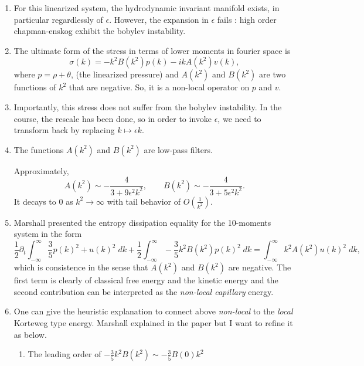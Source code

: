 \documentclass[a4paper,12pt]{article}
\begin{document}
\begin{enumerate}
 \item For this linearized system, the hydrodynamic invariant manifold exists, in particular regardlessly of $\epsilon$. However, the expansion in $\epsilon$ fails : high order chapman-enskog exhibit the bobylev instability.
 
 \item The ultimate form of the stress in terms of lower moments in fourier space is
 $$\sigma(k) = - k^2 B(k^2) p(k) - i k A(k^2)v(k),$$
 where $p = \rho + \theta$, (the linearized pressure) and {{{$A(k^2)$}}} and {{{$B(k^2)$}}} are two functions of {{{$k^2$}}} that are negative. So, it is a non-local operator on $p$ and $v$. 
 \item Importantly, this stress does not suffer from the bobylev instability. In the course, the rescale has been done, so in order to invoke $\epsilon$, we need to transform back by replacing $k \mapsto \epsilon k$. 
 \item The functions $A(k^2)$ and $B(k^2)$ are low-pass filters. 
%  

Approximately,
{{{ $$ A(k^2) \sim -\frac{4}{3 + 9\epsilon^2 k^2}, \qquad B(k^2) \sim -\frac{4}{3 + 5\epsilon^2 k^2}. $$ }}}
It decays to $0$ as $k^2 \rightarrow \infty$ with tail behavior of $O(\frac{1}{k^2})$.

 \item Marshall presented the entropy dissipation equality for the 10-moments system in the form
$$ \frac{1}{2} \partial_t \int_{-\infty}^{\infty} \frac{3}{5} p(k)^2 + u(k)^2 \; dk + \frac{1}{2} \int_{-\infty}^{\infty} -\frac{3}{5}k^2 B(k^2)p(k)^2 \; dk = \int_{-\infty}^{\infty} k^2 A(k^2) u(k)^2 \; dk, $$
which is consistence in the sense that $A(k^2)$ and $B(k^2)$ are negative. The first term is clearly of classical free energy and the kinetic energy and the second contribution can be interpreted as the {\it non-local capillary} energy.

 \item One can give the heuristic explanation to connect above {\it non-local} to the {\it local} Korteweg type energy. Marshall explained in the paper but I want to refine it as below.  
 \begin{enumerate}
 \item The leading order of $-\frac{3}{5}k^2 B(k^2) \sim -\frac{3}{5}B(0) k^2$
 

\end{enumerate}
\end{enumerate}
\end{document}
